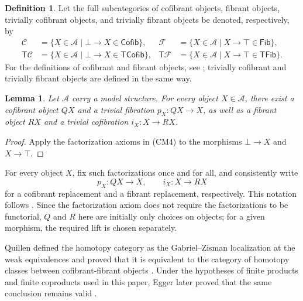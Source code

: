\documentclass[10pt,a4paper]{amsart}
\theoremstyle{plain}
\newtheorem{lemma}[theorem]{Lemma}
\theoremstyle{definition}
\newtheorem{definition}[theorem]{Definition}
\theoremstyle{remark}
\begin{document}
\begin{definition}
  Let the full subcategories of cofibrant objects, fibrant objects, trivially cofibrant objects, and trivially fibrant objects be denoted, respectively, by
  \[
    \begin{aligned}
      \mathcal C
       & =\{X\in\mathcal A\mid \bot\longrightarrow X\in\mathsf{Cofib}\},  &
      \mathcal F
       & =\{X\in\mathcal A\mid X\longrightarrow\top\in\mathsf{Fib}\},       \\
      \mathsf T\mathcal C
       & =\{X\in\mathcal A\mid \bot\longrightarrow X\in\mathsf{TCofib}\}, &
      \mathsf T\mathcal F
       & =\{X\in\mathcal A\mid X\longrightarrow\top\in\mathsf{TFib}\}.
    \end{aligned}
  \]
  For the definitions of cofibrant and fibrant objects, see \cite[Section~3, Remark~3.4]{DwyerSpalinski}; trivially cofibrant and trivially fibrant objects are defined in the same way.
\end{definition}

\begin{lemma}\label{lem:model-replacements}
  Let $\mathcal A$ carry a model structure.
  For every object $X\in\mathcal A$, there exist a cofibrant object $QX$ and a trivial fibration $p_X : QX \longrightarrow X$, as well as a fibrant object $RX$ and a trivial cofibration $i_X : X \longrightarrow RX$.
\end{lemma}

\begin{proof}
  Apply the factorization axioms in (CM4) to the morphisms $\bot\longrightarrow X$ and $X \longrightarrow \top$.
\end{proof}

For every object $X$, fix such factorizations once and for all, and consistently write
\[
  p_X:QX\longrightarrow X,\qquad i_X:X\longrightarrow RX
\]
for a cofibrant replacement and a fibrant replacement, respectively.
This notation follows \cite[Section~5, Lemmas~5.1 and~5.3, pp.~24--25]{DwyerSpalinski}.
Since the factorization axiom does not require the factorizations to be functorial, $Q$ and $R$ here are initially only choices on objects; for a given morphism, the required lift is chosen separately.

\medskip

Quillen defined the homotopy category as the Gabriel--Zisman localization at the weak equivalences and proved that it is equivalent to the category of homotopy classes between cofibrant-fibrant objects \cite[Chapter~I, \S~1, Theorem~1, pp.~24--27]{Quillen}.
Under the hypotheses of finite products and finite coproducts used in this paper, Egger later proved that the same conclusion remains valid \cite[Theorem~3.2]{EggerModelCategories}.
\end{document}
